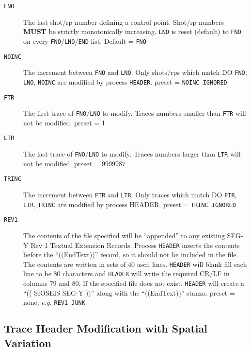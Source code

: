 \begin{description}
\item[\texttt{LNO}] The last \gls{shot}/\gls{rp} number defining a control point.  Shot/\gls{rp}
         numbers \textbf{MUST} be strictly monotonically increasing.  \texttt{LNO} is
         reset (default) to \texttt{FNO} on every \texttt{FNO}/\texttt{LNO}/\texttt{END} list.
         Default = \texttt{FNO}

\item[\texttt{NOINC}] The increment between \texttt{FNO} and \texttt{LNO}.  Only \glspl{shot}/\glspl{rp} which
         match  DO  \texttt{FNO}, \texttt{LNO}, \texttt{NOINC}  are modified by process \texttt{HEADER}.
         \Gls{preset} = \texttt{NOINC IGNORED}

\item[\texttt{FTR}] The first trace of \texttt{FNO}/\texttt{LNO} to modify.  Traces numbers smaller
         than \texttt{FTR} will not be modified.
         \Gls{preset} = 1

\item[\texttt{LTR}] The last trace of \texttt{FNO}/\texttt{LNO} to modify.  Traces numbers larger
         than \texttt{LTR} will not be modified.
         \Gls{preset} = 9999987

\item[\texttt{TRINC}] The increment between \texttt{FTR} and \texttt{LTR}.  Only traces which
         match  DO  \texttt{FTR}, \texttt{LTR}, \texttt{TRINC}  are modified by process HEADER.
         \Gls{preset} = \texttt{TRINC IGNORED}

\item[\texttt{REV1}] The contents of the file specified will be ``appended'' to any
         existing SEG-Y Rev 1 Textual Extension Records.  Process
         \texttt{HEADER} inserts the contents before the ``((EndText))'' record,
         so it should not be included in the file.  The contents
         are written in sets of 40 \gls{ascii} lines.  \texttt{HEADER} will blank
         fill each line to be 80 characters and \texttt{HEADER} will write
         the required CR/LF in columns 79 and 80.
         If the specified file does not exist, \texttt{HEADER} will create
         a ``(( SIOSEIS SEG-Y ))'' along with the ``((EndText))'' stanza.
         \Gls{preset} = none,    \textit{e.g.}   \texttt{REV1 JUNK}
\end{description}

\subsection{Trace Header Modification with Spatial Variation}

